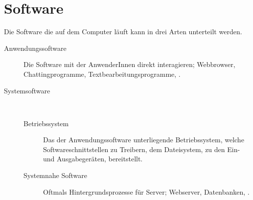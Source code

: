 \documentclass{article}
\begin{document}
\section{Software}
Die Software die auf dem Computer läuft kann in drei Arten unterteilt werden.
\begin{description}
 \item[Anwendungssoftware] Die Software mit der AnwenderInnen direkt interagieren; Webbrowser, Chattingprogramme, Textbearbeitungsprogramme, \etc.
 \item[Systemsoftware]~ 
 \begin{description}
  \item[Betriebssystem] Das der Anwendungssoftware unterliegende Betriebssystem, welche Softwareschnittstellen zu Treibern, dem Dateisystem, zu den Ein- und Ausgabegeräten, \etc bereitstellt.
  \item[Systemnahe Software] Oftmals Hintergrundsprozesse für Server; Webserver, Datenbanken, \etc.
 \end{description}
\end{description}
\end{document}
